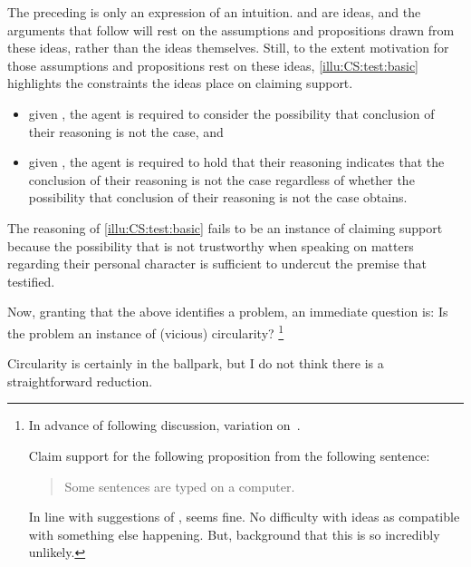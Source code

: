 \begin{note}
  The preceding is only an expression of an intuition.
  \ideaCSA{} and \ideaCSB{} are ideas, and the arguments that follow will rest on the assumptions and propositions drawn from these ideas, rather than the ideas themselves.
  Still, to the extent motivation for those assumptions and propositions rest on these ideas, \autoref{illu:CS:test:basic} highlights the constraints the ideas place on claiming support.

  \begin{itemize}
  \item given \ideaCSA{}, the agent is required to consider the possibility that conclusion of their reasoning is not the case, and
  \item given \ideaCSB{}, the agent is required to hold that their reasoning indicates that the conclusion of their reasoning is not the case regardless of whether the possibility that conclusion of their reasoning is not the case obtains.
  \end{itemize}
  The reasoning of \autoref{illu:CS:test:basic} fails to be an instance of claiming support because the possibility that  is not trustworthy when speaking on matters regarding their personal character is sufficient to undercut the premise that  testified.
\end{note}

\begin{note}
  Now, granting that the above identifies a problem, an immediate question is:
  Is the problem an instance of (vicious) circularity?\nolinebreak
  \footnote{
    In advance of following discussion, variation on~\textcite{Sorensen:1991wh}.

    Claim support for the following proposition from the following sentence:

    \begin{quote}
      Some sentences are typed on a computer.
    \end{quote}

    In line with suggestions of \citeauthor{Sorensen:1991wh}, seems fine.
    No difficulty with ideas as compatible with something else happening.
    But, background that this is so incredibly unlikely.
  }

  Circularity is certainly in the ballpark, but I do not think there is a straightforward reduction.
\end{note}

